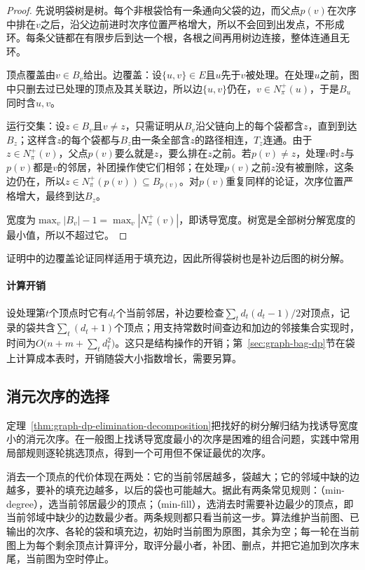 \begin{proof}
先说明袋树是树。每个非根袋恰有一条通向父袋的边，而父点$p(v)$在次序中排在$v$之后，沿父边前进时次序位置严格增大，所以不会回到出发点，不形成环。每条父链都在有限步后到达一个根，各根之间再用树边连接，整体连通且无环。

顶点覆盖由$v\in B_v$给出。边覆盖：设$\{u,v\}\in E$且$u$先于$v$被处理。在处理$u$之前，图中只删去过已处理的顶点及其关联边，所以边$\{u,v\}$仍在，$v\in N^+_\pi(u)$，于是$B_u$同时含$u,v$。

运行交集：设$z\in B_v$且$v\neq z$，只需证明从$B_v$沿父链向上的每个袋都含$z$，直到到达$B_z$；这样含$z$的每个袋都与$B_z$由一条全部含$z$的路径相连，$T_z$连通。由于$z\in N^+_\pi(v)$，父点$p(v)$要么就是$z$，要么排在$z$之前。若$p(v)\neq z$，处理$v$时$z$与$p(v)$都是$v$的邻居，补团操作使它们相邻；在处理$p(v)$之前$z$没有被删除，这条边仍在，所以$z\in N^+_\pi(p(v))\subseteq B_{p(v)}$。对$p(v)$重复同样的论证，次序位置严格增大，最终到达$B_z$。

宽度为$\max_v|B_v|-1=\max_v|N^+_\pi(v)|$，即诱导宽度。树宽是全部树分解宽度的最小值，所以不超过它。
\end{proof}

证明中的边覆盖论证同样适用于填充边，因此所得袋树也是补边后图的树分解。

\paragraph{计算开销}
设处理第$t$个顶点时它有$d_t$个当前邻居，补边要检查$\sum_t d_t(d_t-1)/2$对顶点，记录的袋共含$\sum_t(d_t+1)$个顶点；用支持常数时间查边和加边的邻接集合实现时，时间为$O\bigl(n+m+\sum_t d_t^2\bigr)$。这只是结构操作的开销；第~\ref{sec:graph-bag-dp}节在袋上计算成本表时，开销随袋大小指数增长，需要另算。

\subsection{消元次序的选择}
\label{sec:graph-dp-order-heuristics}

定理~\ref{thm:graph-dp-elimination-decomposition}把找好的树分解归结为找诱导宽度小的消元次序。在一般图上找诱导宽度最小的次序是困难的组合问题，实践中常用局部规则逐轮挑选顶点，得到一个可用但不保证最优的次序。

消去一个顶点的代价体现在两处：它的当前邻居越多，袋越大；它的邻域中缺的边越多，要补的填充边越多，以后的袋也可能越大。据此有两条常见规则：（min-degree），选当前邻居最少的顶点；（min-fill），选消去时需要补边最少的顶点，即当前邻域中缺少的边数最少者。两条规则都只看当前这一步。算法维护当前图、已输出的次序、各轮的袋和填充边，初始时当前图为原图，其余为空；每一轮在当前图上为每个剩余顶点计算评分，取评分最小者，补团、删点，并把它追加到次序末尾，当前图为空时停止。

